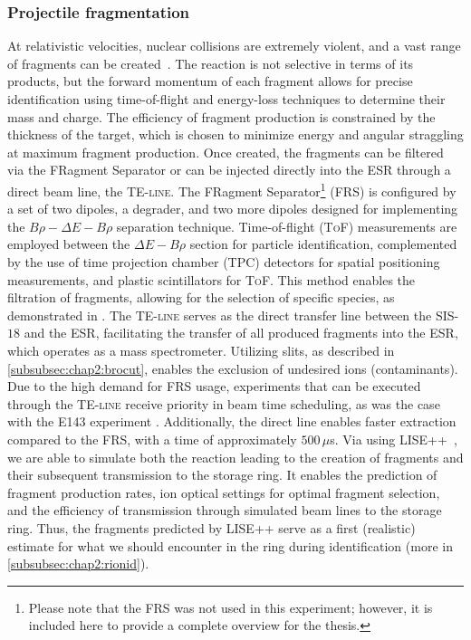 \subsubsection{Projectile fragmentation}\label{subsubsec:chap2:fragmentation}
At relativistic velocities, nuclear collisions are extremely violent, and a vast range of fragments can be created~\cite{projectilefragmentation}. The reaction is not selective in terms of its products, but the forward momentum of each fragment allows for precise identification using time-of-flight and energy-loss techniques to determine their mass and charge. 
The efficiency of fragment production is constrained by the thickness of the target, which is chosen to minimize energy and angular straggling at maximum fragment production. 
Once created, the fragments can be filtered via the FRagment Separator or can be injected directly into the \textsc{ESR} through a direct beam line, the \textsc{TE-line}.
\newpar
The FRagment Separator\footnote{Please note that the \textsc{FRS} was not used in this experiment; however, it is included here to provide a complete overview for the thesis.} \cite{FRS} (\textsc{FRS}) is configured by a set of two dipoles, a degrader, and two more dipoles designed for implementing the $B\rho-\Delta E-B\rho$ separation technique. Time-of-flight (\textsc{ToF}) measurements are employed between the $\Delta E-B\rho$ section for particle identification, complemented by the use of time projection chamber (\textsc{TPC}) detectors for spatial positioning measurements, and plastic scintillators for \textsc{ToF}. This method enables the filtration of fragments, allowing for the selection of specific species, as demonstrated in \cite{Dellmann2024}.
\newpar
The \textsc{TE-line} serves as the direct transfer line between the \textsc{SIS}-$18$ and the \textsc{ESR}, facilitating the transfer of all produced fragments into the \textsc{ESR}, which operates as a mass spectrometer. Utilizing slits, as described in \cref{subsubsec:chap2:brocut}, enables the exclusion of undesired ions (contaminants). Due to the high demand for \textsc{FRS} usage, experiments that can be executed through the \textsc{TE-line} receive priority in beam time scheduling, as was the case with the \textsc{E143} experiment \cite{kortenE143}. Additionally, the direct line enables faster extraction compared to the FRS, with a time of approximately $500\,\mu$s.
\newpar
Via using \textsc{LISE++}~\cite{lise++}, we are able to simulate both the reaction leading to the creation of fragments and their subsequent transmission to the storage ring. It enables the prediction of fragment production rates, ion optical settings for optimal fragment selection, and the efficiency of transmission through simulated beam lines to the storage ring. Thus, the fragments predicted by \textsc{LISE++} serve as a first (realistic) estimate for what we should encounter in the ring during identification (more in \cref{subsubsec:chap2:rionid}). 
